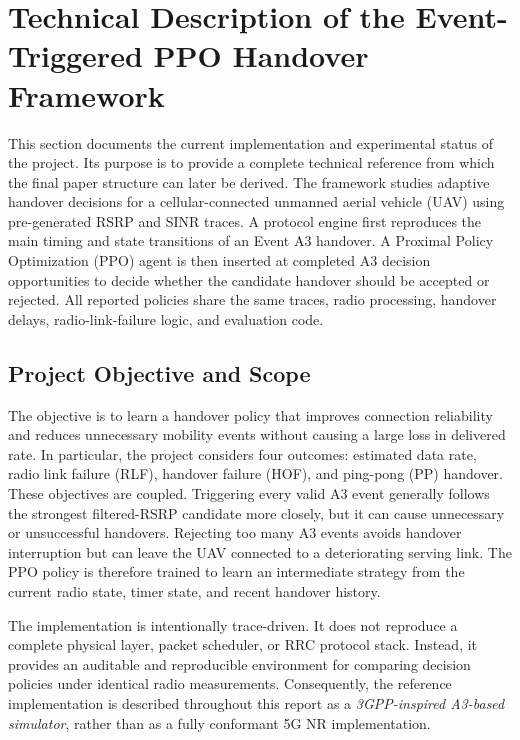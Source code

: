 
\section{Technical Description of the Event-Triggered PPO Handover Framework}
\label{sec:project-technical-report}

This section documents the current implementation and experimental status of
the project. Its purpose is to provide a complete technical reference from
which the final paper structure can later be derived. The framework studies
adaptive handover decisions for a cellular-connected unmanned aerial vehicle
(UAV) using pre-generated RSRP and SINR traces. A protocol engine first
reproduces the main timing and state transitions of an Event A3 handover. A
Proximal Policy Optimization (PPO) agent is then inserted at completed A3
decision opportunities to decide whether the candidate handover should be
accepted or rejected. All reported policies share the same traces, radio
processing, handover delays, radio-link-failure logic, and evaluation code.

\subsection{Project Objective and Scope}

The objective is to learn a handover policy that improves connection
reliability and reduces unnecessary mobility events without causing a large
loss in delivered rate. In particular, the project considers four outcomes:
estimated data rate, radio link failure (RLF), handover failure (HOF), and
ping-pong (PP) handover. These objectives are coupled. Triggering every valid
A3 event generally follows the strongest filtered-RSRP candidate more closely,
but it can cause unnecessary or unsuccessful handovers. Rejecting too many A3
events avoids handover interruption but can leave the UAV connected to a
deteriorating serving link. The PPO policy is therefore trained to learn an
intermediate strategy from the current radio state, timer state, and recent
handover history.

The implementation is intentionally trace-driven. It does not reproduce a
complete physical layer, packet scheduler, or RRC protocol stack. Instead, it
provides an auditable and reproducible environment for comparing decision
policies under identical radio measurements. Consequently, the reference
implementation is described throughout this report as a
\emph{3GPP-inspired A3-based simulator}, rather than as a fully conformant 5G
NR implementation.

